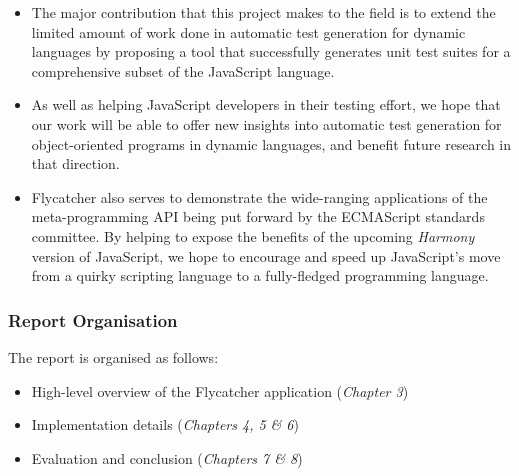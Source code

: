 \begin{itemize}
   \item The major contribution that this project makes to the field is to extend the limited amount of work done in automatic test generation for dynamic languages by proposing a tool that successfully generates unit test suites for a comprehensive subset of the JavaScript language.
   \item As well as helping JavaScript developers in their testing effort, we hope that our work will be able to offer new insights into automatic test generation for object-oriented programs in dynamic languages, and benefit future research in that direction.
   \item \textsf{Flycatcher} also serves to demonstrate the wide-ranging applications of the meta-programming API being put forward by the ECMAScript standards committee. By helping to expose the benefits of the upcoming \emph{Harmony} version of JavaScript, we hope to encourage and  speed up JavaScript's move from a quirky scripting language to a fully-fledged programming language.
\end{itemize}

\subsubsection{Report Organisation}
The report is organised as follows:
\begin{itemize}
   \item High-level overview of the \textsf{Flycatcher} application (\textit{Chapter 3})
   \item Implementation details (\textit{Chapters 4, 5 \& 6})
   \item Evaluation and conclusion (\textit{Chapters 7 \& 8})
\end{itemize}